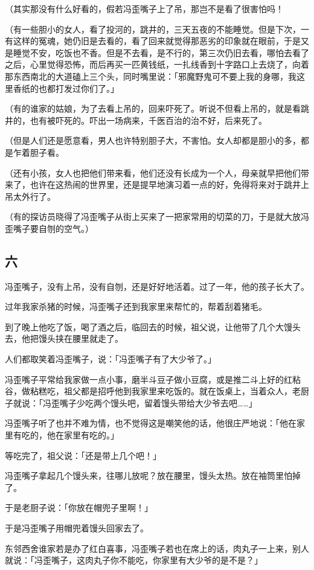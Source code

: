 \documentclass[UTF8]{ctexart}
\begin{document}
（其实那没有什么好看的，假若冯歪嘴子上了吊，那岂不是看了很害怕吗！

（有一些胆小的女人，看了投河的，跳井的，三天五夜的不能睡觉。但是下次，一有这样的冤魂，她仍旧是去看的，看了回来就觉得那恶劣的印象就在眼前，于是又是睡觉不安，吃饭也不香。但是不去看，是不行的，第三次仍旧去看，哪怕去看了之后，心里觉得恐怖，而后再买一匹黄钱纸，一扎线香到十字路口上去烧了，向着那东西南北的大道磕上三个头，同时嘴里说：「邪魔野鬼可不要上我的身哪，我这里香纸的也都打发过你们了。」

（有的谁家的姑娘，为了去看上吊的，回来吓死了。听说不但看上吊的，就是看跳井的，也有被吓死的。吓出一场病来，千医百治的治不好，后来死了。

（但是人们还是愿意看，男人也许特别胆子大，不害怕。女人却都是胆小的多，都是乍着胆子看。

（还有小孩，女人也把他们带来看，他们还没有长成为一个人，母亲就早把他们带来了，也许在这热闹的世界里，还是提早地演习着一点的好，免得将来对于跳井上吊太外行了。

（有的探访员晓得了冯歪嘴子从街上买来了一把家常用的切菜的刀，于是就大放冯歪嘴子要自刎的空气。）

\subsection{六}

冯歪嘴子，没有上吊，没有自刎，还是好好地活着。过了一年，他的孩子长大了。

过年我家杀猪的时候，冯歪嘴子还到我家里来帮忙的，帮着刮着猪毛。

到了晚上他吃了饭，喝了酒之后，临回去的时候，祖父说，让他带了几个大馒头去，他把馒头挟在腰里就走了。

人们都取笑着冯歪嘴子，说：「冯歪嘴子有了大少爷了。」

冯歪嘴子平常给我家做一点小事，磨半斗豆子做小豆腐，或是推二斗上好的红粘谷，做粘糕吃，祖父都是招呼他到我家里来吃饭的。就在饭桌上，当着众人，老厨子就说：「冯歪嘴子少吃两个馒头吧，留着馒头带给大少爷去吧……」

冯歪嘴子听了也并不难为情，也不觉得这是嘲笑他的话，他很庄严地说：「他在家里有吃的，他在家里有吃的。」

等吃完了，祖父说：「还是带上几个吧！」

冯歪嘴子拿起几个馒头来，往哪儿放呢？放在腰里，馒头太热。放在袖筒里怕掉了。

于是老厨子说：「你放在帽兜子里啊！」

于是冯歪嘴子用帽兜着馒头回家去了。

东邻西舍谁家若是办了红白喜事，冯歪嘴子若也在席上的话，肉丸子一上来，别人就说：「冯歪嘴子，这肉丸子你不能吃，你家里有大少爷的是不是？」
\end{document}
